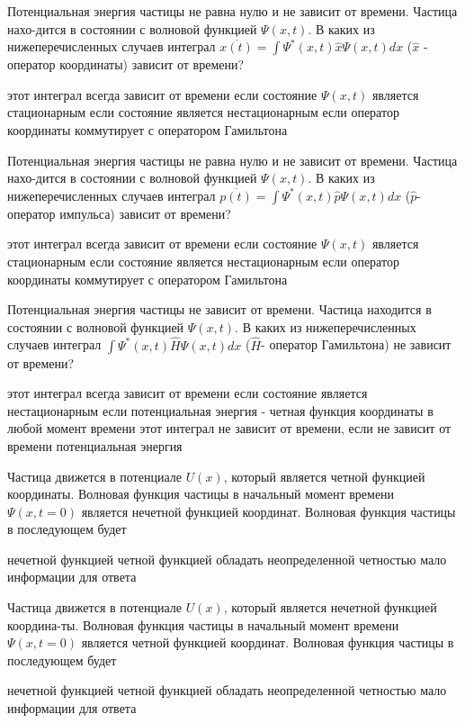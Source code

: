 \documentclass[11pt,a4paper]{exam}
\begin{document}
\begin{questions}
\question Потенциальная энергия частицы не равна нулю и не зависит от времени. Частица нахо-дится в состоянии с волновой функцией $\Psi (x,t)$. В каких из нижеперечисленных случаев интеграл $\overline {x(t)}  = \int {{\Psi ^*}(x,t)\hat x\Psi (x,t)dx} $ ($\hat x$ - оператор координаты) зависит от времени?
\begin{choices}
\choice этот интеграл всегда зависит от времени
\choice если состояние $\Psi (x,t)$ является стационарным
\choice если состояние является нестационарным
\choice если оператор координаты коммутирует с оператором Гамильтона
\end{choices}

\question Потенциальная энергия частицы не равна нулю и не зависит от времени. Частица нахо-дится в состоянии с волновой функцией $\Psi (x,t)$. В каких из нижеперечисленных случаев интеграл $\overline {p(t)}  = \int {{\Psi ^*}(x,t)\hat p\Psi (x,t)dx} $ ($\hat p$- оператор импульса) зависит от времени?
\begin{choices}
\choice этот интеграл всегда зависит от времени
\choice если состояние $\Psi (x,t)$ является стационарным
\choice если состояние является нестационарным
\choice если оператор координаты коммутирует с оператором Гамильтона
\end{choices}

\question Потенциальная энергия частицы не зависит от времени. Частица находится в состоянии с волновой функцией $\Psi (x,t)$. В каких из нижеперечисленных случаев интеграл $\int {{\Psi ^*}(x,t)\hat H\Psi (x,t)dx} $ ($\hat H$- оператор Гамильтона) не зависит от времени?
\begin{choices}
\choice этот интеграл всегда зависит от времени
\choice если состояние является нестационарным
\choice если потенциальная энергия - четная функция координаты в любой момент времени
\choice этот интеграл не зависит от времени, если не зависит от времени потенциальная энергия
\end{choices}

\question Частица движется в потенциале $U(x)$, который является четной функцией координаты. Волновая функция частицы в начальный момент времени $\Psi (x,t = 0)$ является нечетной функцией координат. Волновая функция частицы в последующем будет
\begin{choices}
\choice нечетной функцией           
\choice четной функцией 
\choice обладать неопределенной четностью    
\choice мало информации для ответа
\end{choices}

\question Частица движется в потенциале $U(x)$, который является нечетной функцией координа-ты. Волновая функция частицы в начальный момент времени $\Psi (x,t = 0)$ является четной функцией координат. Волновая функция частицы в последующем будет
\begin{choices}
\choice нечетной функцией           
\choice четной функцией
\choice обладать неопределенной четностью    
\choice мало информации для ответа
\end{choices}


\end{questions}
\end{document}
